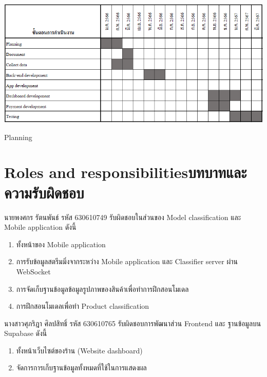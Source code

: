 \begin{table}[h]
    \begin{center}

        \vspace{0.5cm}\includegraphics[scale=0.64]{pic/plane.png}
    \end{center}

    \caption[Planning]{Planning}
    \label{table:Planning}
\end{table}

\newpage
\section{\ifenglish Roles and responsibilities\else บทบาทและความรับผิดชอบ\fi}
นายพงศกร รัตนพันธ์ รหัส 630610749 รับผิดชอบในส่วนของ Model classification และ Mobile application ดังนี้

\begin{enumerate}
    \item ทั้งหน้าของ Mobile application
    \item การรับข้อมูลสตรีมมิ่งจากระหว่าง Mobile application และ  Classifier server ผ่าน WebSocket
    \item การจัดเก็บฐานข้อมูลข้อมูลรูปภาพของสินค้าเพื่อทำการฝึกสอนโมเดล
    \item การฝึกสอนโมเดลเพื่อทำ Product classification
\end{enumerate}


นางสาวศุภริฎา  ศิลปสิทธิ์ รหัส 630610765 รับผิดชอบการพัฒนาส่วน Frontend และ ฐานข้อมูลบน Supabase ดังนี้
\begin{enumerate}
    \item ทั้งหน้าเว็บไซต์ของร้าน (Website dashboard)
    \item จัดการการเก็บฐานข้อมูลทั้งหมดที่ใช้ในการแสดงผล
\end{enumerate}
